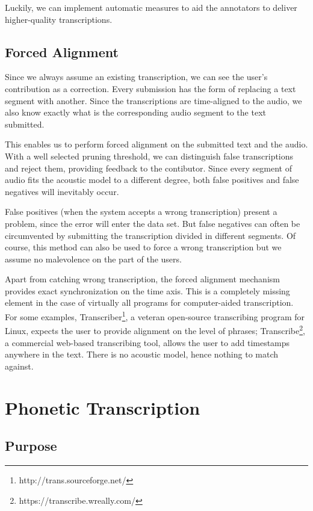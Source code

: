\documentclass{itatnew}
\begin{document}
Luckily, we can implement automatic measures to aid the annotators to deliver
higher-quality transcriptions.

\subsection{Forced Alignment}

Since we always assume an existing transcription, we can see the user's
contribution as a correction. Every submission has
the form of replacing a text segment with another. Since the transcriptions are
time-aligned to the audio, we also know exactly what is the corresponding audio
segment to the text submitted.

This enables us to perform forced alignment on the submitted text and the audio.
With a well selected pruning threshold, we can distinguish false transcriptions
and reject them, providing feedback to the contibutor.
Since every segment of audio fits the acoustic model to a different degree, both
false positives and false negatives will inevitably occur.

False positives (when the system accepts a wrong transcription) present a
problem, since the error will enter the data set. But false negatives can often
be circumvented by submitting the transcription divided in different segments.
Of course, this method can also be used to force a wrong transcription but we
assume no malevolence on the part of the users.

Apart from catching wrong transcription, the forced alignment mechanism provides
exact synchronization on the time axis. This is a completely missing element in
the case of virtually all programs for computer-aided transcription. For some
examples, Transcriber\footnote{http://trans.sourceforge.net/}, a veteran
open-source transcribing program for Linux, expects the user to provide
alignment on the level of phrases;
Transcribe\footnote{https://transcribe.wreally.com/}, a commercial web-based
transcribing tool, allows the user to add timestamps anywhere in the text. There
is no acoustic model, hence nothing to match against.

\section{Phonetic Transcription}

\subsection{Purpose}
\end{document}
